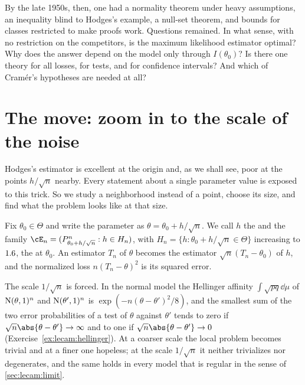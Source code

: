 \begin{refsection}
By the late 1950s, then, one had a normality theorem under heavy assumptions, an inequality blind to Hodges's example, a null-set theorem, and bounds for classes restricted to make proofs work. Questions remained. In what sense, with no restriction on the competitors, is the maximum likelihood estimator optimal? Why does the answer depend on the model only through $I(\theta_0)$? Is there one theory for all losses, for tests, and for confidence intervals? And which of Cramér's hypotheses are needed at all?

\section{The move: zoom in to the scale of the noise}\label{sec:lecam:move}

Hodges's estimator is excellent at the origin and, as we shall see, poor at the points $h/\sqrt n$ nearby. Every statement about a single parameter value is exposed to this trick. So we study a neighborhood instead of a point, choose its size, and find what the problem looks like at that size.

Fix $\theta_0\in\Theta$ and write the parameter as $\theta=\theta_0+h/\sqrt n$. We call $h$ the  and the family $\cE_n=(P^n_{\theta_0+h/\sqrt n}:h\in H_n)$, with $H_n=\{h:\theta_0+h/\sqrt n\in\Theta\}$ increasing to $1.6$, the  at $\theta_0$. An estimator $T_n$ of $\theta$ becomes the estimator $\sqrt n(T_n-\theta_0)$ of $h$, and the normalized loss $n(T_n-\theta)^2$ is its squared error.

The scale $1/\sqrt n$ is forced. In the normal model the Hellinger affinity $\int\sqrt{pq}\dd\mu$ of $\mathrm{N}(\theta,1)^n$ and $\mathrm{N}(\theta',1)^n$ is $\exp(-n(\theta-\theta')^2/8)$, and the smallest sum of the two error probabilities of a test of $\theta$ against $\theta'$ tends to zero if $\sqrt n\abs{\theta-\theta'}\to\infty$ and to one if $\sqrt n\abs{\theta-\theta'}\to0$ (Exercise~\ref{ex:lecam:hellinger}). At a coarser scale the local problem becomes trivial and at a finer one hopeless; at the scale $1/\sqrt n$ it neither trivializes nor degenerates, and the same holds in every model that is regular in the sense of \cref{sec:lecam:limit}.


\end{refsection}
